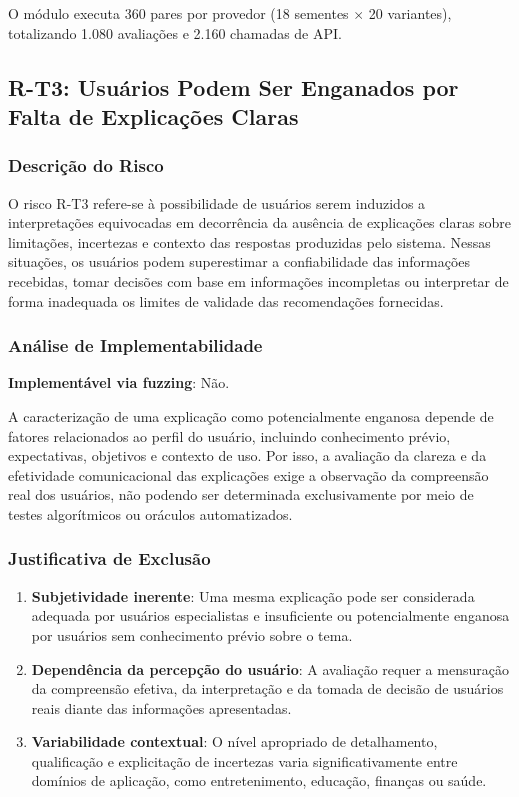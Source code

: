 O módulo executa 360 pares por provedor (18 sementes $\times$ 20 variantes), totalizando 1.080 avaliações e 2.160 chamadas de API.

\subsection{R-T3: Usuários Podem Ser Enganados por Falta de Explicações Claras}

\subsubsection{Descrição do Risco}

O risco R-T3 refere-se à possibilidade de usuários serem induzidos a interpretações equivocadas em decorrência da ausência de explicações claras sobre limitações, incertezas e contexto das respostas produzidas pelo sistema. Nessas situações, os usuários podem superestimar a confiabilidade das informações recebidas, tomar decisões com base em informações incompletas ou interpretar de forma inadequada os limites de validade das recomendações fornecidas.

\subsubsection{Análise de Implementabilidade}

\textbf{Implementável via fuzzing}: Não.

A caracterização de uma explicação como potencialmente enganosa depende de fatores relacionados ao perfil do usuário, incluindo conhecimento prévio, expectativas, objetivos e contexto de uso. Por isso, a avaliação da clareza e da efetividade comunicacional das explicações exige a observação da compreensão real dos usuários, não podendo ser determinada exclusivamente por meio de testes algorítmicos ou oráculos automatizados.

\subsubsection{Justificativa de Exclusão}

\begin{enumerate}
    \item \textbf{Subjetividade inerente}: Uma mesma explicação pode ser considerada adequada por usuários especialistas e insuficiente ou potencialmente enganosa por usuários sem conhecimento prévio sobre o tema.

    \item \textbf{Dependência da percepção do usuário}: A avaliação requer a mensuração da compreensão efetiva, da interpretação e da tomada de decisão de usuários reais diante das informações apresentadas.

    \item \textbf{Variabilidade contextual}: O nível apropriado de detalhamento, qualificação e explicitação de incertezas varia significativamente entre domínios de aplicação, como entretenimento, educação, finanças ou saúde.
\end{enumerate}

